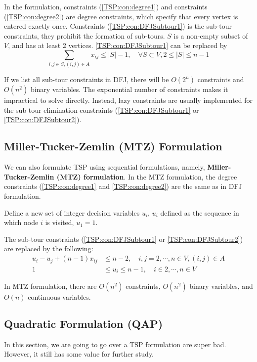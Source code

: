 					In the formulation, constraints (\ref{TSP:con:degree1}) and constraints (\ref{TSP:con:degree2}) are degree constraints, which specify that every vertex is entered exactly once. Constraints (\ref{TSP:con:DFJSubtour1}) is the sub-tour constraints, they prohibit the formation of sub-tours. $S$ is a non-empty subset of $V$, and has at least 2 vertices. \ref{TSP:con:DFJSubtour1} can be replaced by
					\begin{equation}
						\sum_{i, j \in S, (i, j) \in A} x_{ij} \le |S| - 1, \quad \forall S \subset V, 2\le |S| \le n-1\label{TSP:con:DFJSubtour2}
					\end{equation}

					If we list all sub-tour constraints in DFJ, there will be $O(2^n)$ constraints and $O(n^2)$ binary variables. The exponential number of constraints makes it impractical to solve directly. Instead, lazy constraints are usually implemented for the sub-tour elimination constraints (\ref{TSP:con:DFJSubtour1} or \ref{TSP:con:DFJSubtour2}).

				\subsection{Miller-Tucker-Zemlin (MTZ) Formulation}
					We can also formulate TSP using sequential formulations, namely, \textbf{Miller-Tucker-Zemlin (MTZ) formulation}. In the MTZ formulation, the degree constraints (\ref{TSP:con:degree1} and \ref{TSP:con:degree2}) are the same as in DFJ formulation.

					Define a new set of integer decision variables $u_i$, $u_i$ defined as the sequence in which node $i$ is visited, $u_1 = 1$.

					The sub-tour constraints (\ref{TSP:con:DFJSubtour1} or \ref{TSP:con:DFJSubtour2}) are replaced by the following:
					\begin{align}
						u_i - u_j + (n - 1) x_{ij} &\le n - 2, \quad i, j = 2, \cdots, n \in V, (i, j) \in A \label{TSP:con:MTZ1}\\
						1 & \le u_i \le n - 1, \quad i \in 2, \cdots, n \in V \label{TSP:con:MTZ2}
					\end{align}

					In MTZ formulation, there are $O(n^2)$ constraints, $O(n^2)$ binary variables, and $O(n)$ continuous variables.

				\subsection{Quadratic Formulation (QAP)}
					In this section, we are going to go over a TSP formulation are super bad. However, it still has some value for further study.


